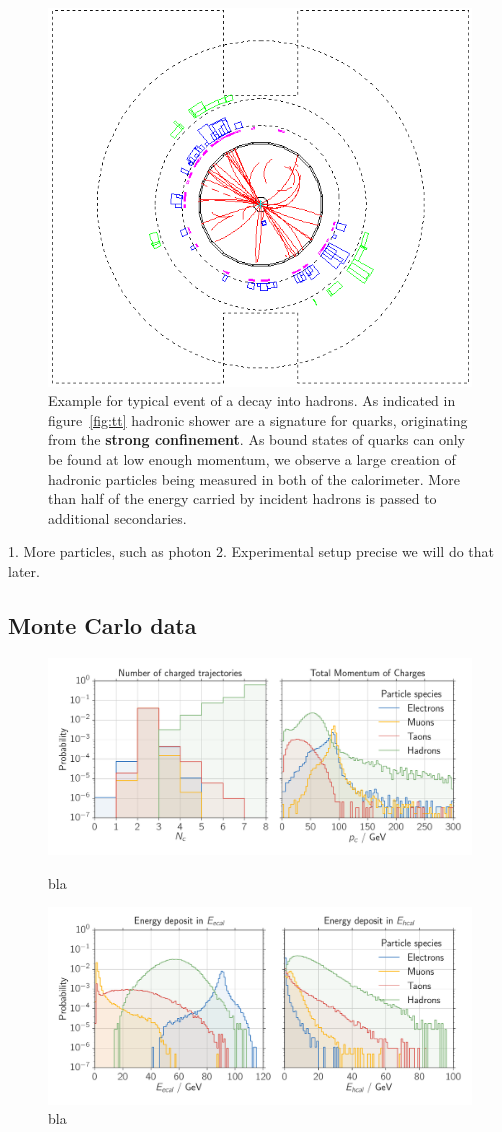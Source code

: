 \begin{figure}[htpb]
    \centering
    \includegraphics[width=0.8\linewidth]{figures/qq_02.png}
    \caption{Example for typical event of a decay into hadrons. As indicated in figure~\ref{fig:tt} hadronic shower are 
   a signature for quarks, originating from the \textbf{strong confinement}. 
   As bound states of quarks can only be found at low enough
   momentum, we observe a large creation of hadronic particles being
   measured in both of the calorimeter. More than half of
   the energy carried by incident hadrons is passed to additional secondaries. }
\label{fig:qq}
\end{figure}
1. More particles, such as photon
2. Experimental setup precise 
we will do that later.


\clearpage
\newpage
\subsection{Monte Carlo data}

\begin{figure}[htpb]
    \centering
    \includegraphics[width=1.0\linewidth]{figures/N_p_c}
    \caption{ bla}
    \includegraphics[width=1.0\linewidth]{figures/E_cal}
    \caption{bla}
\label{fig:monte1}
\end{figure}


